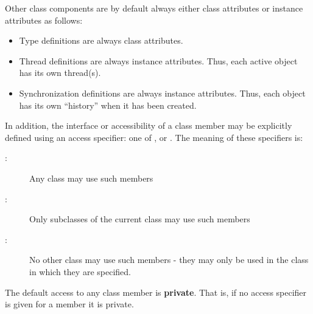 \documentclass[\pformat,12pt]{article}
\begin{document}
Other class components are by default always either class attributes
or instance attributes as follows:

\begin{itemize}
\item Type definitions are always class attributes.
\item Thread definitions are always instance attributes. Thus, each active
  object has its own thread(s).
\item Synchronization definitions are always instance attributes. Thus, each
  object has its own ``history'' when it has been created.
\end{itemize}

In addition, the interface or accessibility of a class member may be
explicitly defined using an access specifier: one of ,
 or . The meaning of these specifiers
is:
\begin{description}
\item[:] Any class may use such members
\item[:] Only subclasses of the current class may use
  such members
\item[:] No other class may use such members - they may
  only be used in the class in which they are specified.
\end{description}

The default access to any class member is \textbf{private}. That is,
if no access specifier is given for a member it is private.
\end{document}
